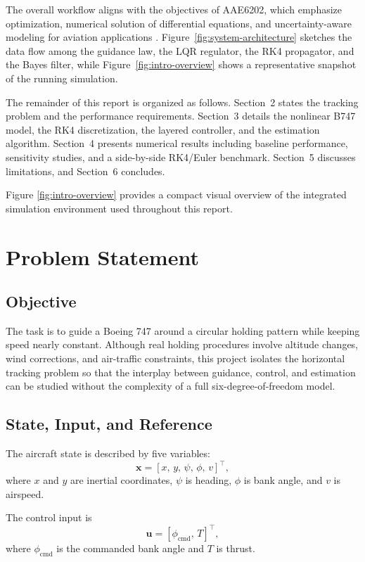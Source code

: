 \documentclass{Academic}
\begin{document}
The overall workflow aligns with the objectives of AAE6202, which emphasize optimization, numerical solution of differential equations, and uncertainty-aware modeling for aviation applications \supercite{liu2026aae6202}. Figure~\ref{fig:system-architecture} sketches the data flow among the guidance law, the LQR regulator, the RK4 propagator, and the Bayes filter, while Figure~\ref{fig:intro-overview} shows a representative snapshot of the running simulation.

The remainder of this report is organized as follows. Section~2 states the tracking problem and the performance requirements. Section~3 details the nonlinear B747 model, the RK4 discretization, the layered controller, and the estimation algorithm. Section~4 presents numerical results including baseline performance, sensitivity studies, and a side-by-side RK4/Euler benchmark. Section~5 discusses limitations, and Section~6 concludes.

Figure \ref{fig:intro-overview} provides a compact visual overview of the integrated simulation environment used throughout this report.

\section{Problem Statement}

\subsection{Objective}

The task is to guide a Boeing 747 around a circular holding pattern while keeping speed nearly constant. Although real holding procedures involve altitude changes, wind corrections, and air-traffic constraints, this project isolates the horizontal tracking problem so that the interplay between guidance, control, and estimation can be studied without the complexity of a full six-degree-of-freedom model.

\subsection{State, Input, and Reference}

The aircraft state is described by five variables:
\[
\mathbf{x}=[x,\,y,\,\psi,\,\phi,\,v]^\top,
\]
where \(x\) and \(y\) are inertial coordinates, \(\psi\) is heading, \(\phi\) is bank angle, and \(v\) is airspeed.

The control input is
\[
\mathbf{u}=[\phi_{\mathrm{cmd}},\,T]^\top,
\]
where \(\phi_{\mathrm{cmd}}\) is the commanded bank angle and \(T\) is thrust.
\end{document}
